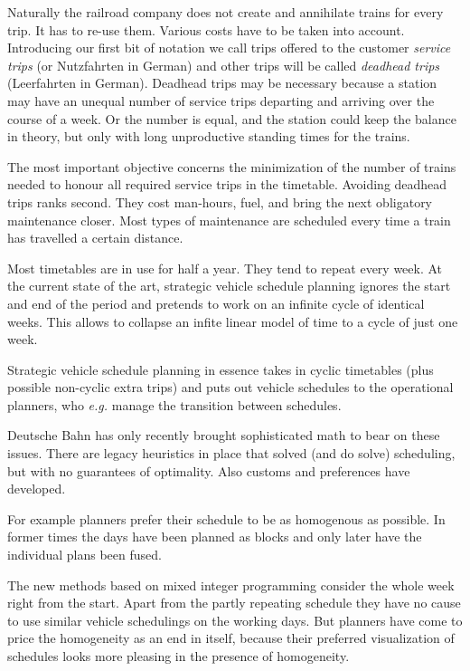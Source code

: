 \documentclass[a4paper]{amsart}
\theoremstyle{definition}
\def\eg{\emph{e.g.}}
\newcommand\mpar[1]{\marginpar {\flushleft\sffamily\small #1}}
\newcommand{\todo}[1]{\mpar{#1}}
\begin{document}
Naturally the railroad company does not create and annihilate trains
for every trip.  It has to re-use them.  Various costs have to be
taken into account.  Introducing our first bit of notation we call
trips offered to the customer \textit{service trips} (or Nutzfahrten
in German) and other trips will be called \textit{deadhead trips}
(Leerfahrten in German).  Deadhead trips may be necessary because a
station may have an unequal number of service trips departing and
arriving over the course of a week.  Or the number is equal, and the
station could keep the balance in theory, but only with long
unproductive standing times for the trains.

The most important objective concerns the minimization of the number
of trains needed to honour all required service trips in the
timetable.  Avoiding deadhead trips ranks second.  They cost man-hours,
fuel, and bring the next obligatory maintenance closer.  Most types of
maintenance are scheduled every time a train has travelled a certain
distance.

Most timetables are in use for half a year.  They tend to repeat every
week.  At the current state of the art, strategic vehicle schedule
planning ignores the start and end of the period and pretends to work
on an infinite cycle of identical weeks.  This allows to collapse an
infite linear model of time to a cycle of just one week.

Strategic vehicle schedule planning in essence takes in cyclic
timetables (plus possible non-cyclic extra trips) and puts out vehicle
schedules to the operational planners, who \eg{} manage the transition
between schedules.

Deutsche Bahn has only recently brought sophisticated math to bear on
these issues.  There are legacy heuristics in place that solved (and
do solve) scheduling, but with no guarantees of optimality.  Also
customs and preferences have developed.

For example planners prefer their schedule to be as homogenous as
possible.  \todo{Why?} In former times the days have been planned as
blocks and only later have the individual plans been fused.

The new methods based on mixed integer programming consider the whole
week right from the start.  Apart from the partly repeating schedule
they have no cause to use similar vehicle schedulings on the working
days.  But planners have come to price the homogeneity as an end in
itself, because their preferred visualization of schedules
looks more pleasing in the presence of homogeneity.
\todo{Add more about blocks. Visualization.}
\end{document}
